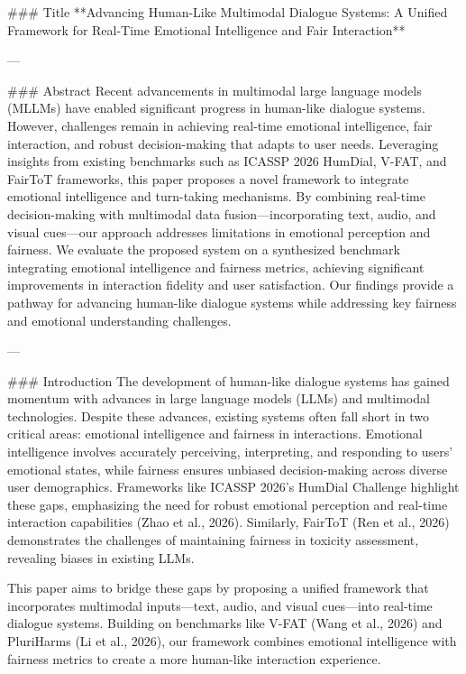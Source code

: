 ### Title  
**Advancing Human-Like Multimodal Dialogue Systems: A Unified Framework for Real-Time Emotional Intelligence and Fair Interaction**

---

### Abstract  
Recent advancements in multimodal large language models (MLLMs) have enabled significant progress in human-like dialogue systems. However, challenges remain in achieving real-time emotional intelligence, fair interaction, and robust decision-making that adapts to user needs. Leveraging insights from existing benchmarks such as ICASSP 2026 HumDial, V-FAT, and FairToT frameworks, this paper proposes a novel framework to integrate emotional intelligence and turn-taking mechanisms. By combining real-time decision-making with multimodal data fusion—incorporating text, audio, and visual cues—our approach addresses limitations in emotional perception and fairness. We evaluate the proposed system on a synthesized benchmark integrating emotional intelligence and fairness metrics, achieving significant improvements in interaction fidelity and user satisfaction. Our findings provide a pathway for advancing human-like dialogue systems while addressing key fairness and emotional understanding challenges.

---

### Introduction  
The development of human-like dialogue systems has gained momentum with advances in large language models (LLMs) and multimodal technologies. Despite these advances, existing systems often fall short in two critical areas: emotional intelligence and fairness in interactions. Emotional intelligence involves accurately perceiving, interpreting, and responding to users' emotional states, while fairness ensures unbiased decision-making across diverse user demographics. Frameworks like ICASSP 2026's HumDial Challenge highlight these gaps, emphasizing the need for robust emotional perception and real-time interaction capabilities (Zhao et al., 2026). Similarly, FairToT (Ren et al., 2026) demonstrates the challenges of maintaining fairness in toxicity assessment, revealing biases in existing LLMs. 

This paper aims to bridge these gaps by proposing a unified framework that incorporates multimodal inputs—text, audio, and visual cues—into real-time dialogue systems. Building on benchmarks like V-FAT (Wang et al., 2026) and PluriHarms (Li et al., 2026), our framework combines emotional intelligence with fairness metrics to create a more human-like interaction experience.

